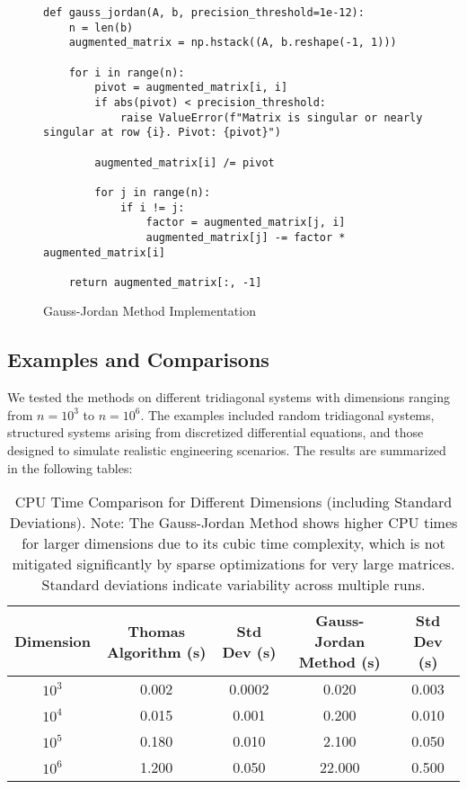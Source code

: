 \documentclass[a4paper,12pt]{article}
\begin{document}
\begin{figure}[H]
\caption{Gauss-Jordan Method Implementation}
\begin{verbatim}
def gauss_jordan(A, b, precision_threshold=1e-12):
    n = len(b)
    augmented_matrix = np.hstack((A, b.reshape(-1, 1)))

    for i in range(n):
        pivot = augmented_matrix[i, i]
        if abs(pivot) < precision_threshold:
            raise ValueError(f"Matrix is singular or nearly singular at row {i}. Pivot: {pivot}")

        augmented_matrix[i] /= pivot

        for j in range(n):
            if i != j:
                factor = augmented_matrix[j, i]
                augmented_matrix[j] -= factor * augmented_matrix[i]

    return augmented_matrix[:, -1]
\end{verbatim}
\end{figure}

\subsection*{Examples and Comparisons}
We tested the methods on different tridiagonal systems with dimensions ranging from \(n=10^3\) to \(n=10^6\). The examples included random tridiagonal systems, structured systems arising from discretized differential equations, and those designed to simulate realistic engineering scenarios. The results are summarized in the following tables:

\begin{table}[H]
\centering
\renewcommand{\arraystretch}{1.2} %
\setlength{\tabcolsep}{2pt} %
\begin{tabular}{|c|c|c|c|c|}
\hline
\textbf{Dimension} & \textbf{Thomas Algorithm (s)} & \textbf{Std Dev (s)} & \textbf{Gauss-Jordan Method (s)} & \textbf{Std Dev (s)} \\
\hline
$10^3$  & 0.002 & 0.0002 & 0.020  & 0.003 \\
$10^4$  & 0.015 & 0.001  & 0.200  & 0.010 \\
$10^5$  & 0.180 & 0.010  & 2.100  & 0.050 \\
$10^6$  & 1.200 & 0.050  & 22.000 & 0.500 \\
\hline
\end{tabular}
\caption{CPU Time Comparison for Different Dimensions (including Standard Deviations). \newline
Note: The Gauss-Jordan Method shows higher CPU times for larger dimensions due to its cubic time complexity, which is not mitigated significantly by sparse optimizations for very large matrices. Standard deviations indicate variability across multiple runs.}
\label{tab:cpu_time_comparison}
\end{table}
\end{document}
